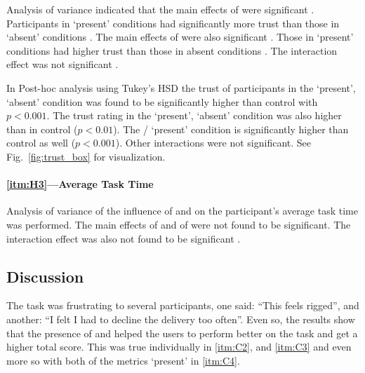 Analysis of variance indicated that the main effects of \xQ{} were significant . Participants in \xQ{} `present' conditions  had significantly more trust than those in \xQ{} `absent' conditions . The main effects of \xO{} were also significant . Those in \xO{} `present' conditions  had higher trust than those in \xO{} absent conditions . The interaction effect was not significant .

In Post-hoc analysis using Tukey's HSD the trust of participants in the \xQ{} `present', \xO{} `absent' condition  was found to be significantly higher than control  with $p<0.001$. The trust rating in the \xO{} `present', \xQ{} `absent' condition  was also higher than in control ($p<0.01$). The \xQ/\xO{} `present' condition  is significantly higher than control as well ($p<0.001$). Other interactions were not significant. See Fig.~\ref{fig:trust_box} for visualization.

\paragraph{\ref{itm:H3}---Average Task Time}
Analysis of variance of the influence of \xQ{} and \xO{} on the participant's average task time was performed. The main effects of \xQ{}  and of \xO{}  were not found to be significant. The interaction effect was also not found to be significant .

\subsection{Discussion} \label{sec:discussion}
The task was frustrating to several participants, one said: ``This feels rigged'', and another: ``I felt I had to decline the delivery too often''. Even so, the results show that the presence of \xQ{} and \xO{} helped the users to perform better on the task and get a higher total score. This was true individually in \ref{itm:C2}, and \ref{itm:C3} and even more so with both of the metrics `present' in \ref{itm:C4}. 

